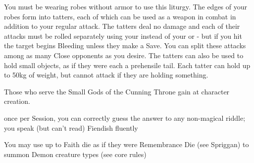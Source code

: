 {\LITURGY [
  Name= Tattered Robe,
  Link=king-in-yellow-liturgy-tattered-robe,
  Paradigm= Entropy ,
  Save=  Y (negates Bleeding) ,
  Duration= Combat or \SUMDICE Minutes ,
  Counter=  n/a  ,
  Keywords= None ,
  Target=   Self
]



You must be wearing robes without armor to use this liturgy.  The edges of your robes form into \DICE tatters, each of which can be used as a weapon in combat in addition to your regular attack. The tatters deal no damage and each of their attacks must be rolled separately using your \FOC instead of your \VIG or \DEX - but if you hit the target begins Bleeding unless they make a Save.  You can split these attacks among as many Close opponents as you desire.
The tatters can also be used to hold small objects, as if they were each a prehensile tail.  Each tatter can hold up to 50kg of weight, but cannot attack if they are holding something.

\newpage





Those who serve the Small Gods of the Cunning Throne gain \DCUP \INT at character creation.







\GOD[
Name=Cthulhu,
Link=small-god-cthulhu,
GodOf=Arbiter of Mysteries and Riddles,
Holy=A piece of jewelry depicting an octopus
]


once per Session, you can correctly guess the answer to any non-magical riddle; you speak (but can't read) Fiendish fluently


You may use up to \LVL Faith die as if they were Remembrance Die (see Spriggan) to summon Demon creature types (see core rules)




}
